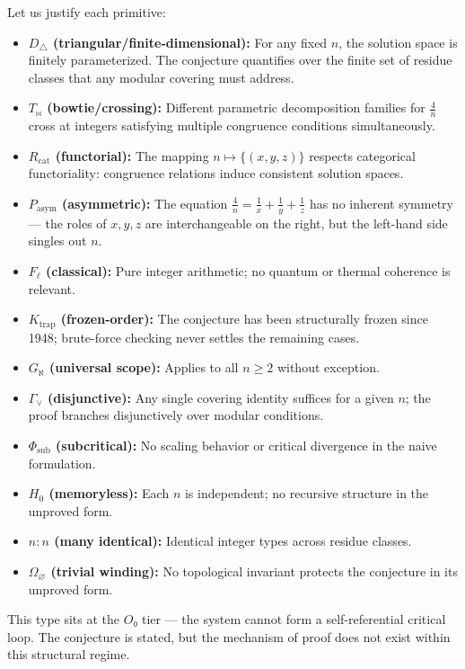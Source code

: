 \documentclass[12pt,a4paper]{article}
\begin{document}
Let us justify each primitive:

\begin{itemize}
    \item \textbf{$D_{\triangle}$ (triangular/finite-dimensional):} For any fixed $n$, the solution space is finitely parameterized. The conjecture quantifies over the finite set of residue classes that any modular covering must address.
    \item \textbf{$T_{\bowtie}$ (bowtie/crossing):} Different parametric decomposition families for $\frac{4}{n}$ cross at integers satisfying multiple congruence conditions simultaneously.
    \item \textbf{$R_\text{cat}$ (functorial):} The mapping $n \mapsto \{(x,y,z)\}$ respects categorical functoriality: congruence relations induce consistent solution spaces.
    \item \textbf{$P_\text{asym}$ (asymmetric):} The equation $\frac{4}{n} = \frac{1}{x} + \frac{1}{y} + \frac{1}{z}$ has no inherent symmetry --- the roles of $x, y, z$ are interchangeable on the right, but the left-hand side singles out $n$.
    \item \textbf{$F_{\ell}$ (classical):} Pure integer arithmetic; no quantum or thermal coherence is relevant.
    \item \textbf{$K_\text{trap}$ (frozen-order):} The conjecture has been structurally frozen since 1948; brute-force checking never settles the remaining cases.
    \item \textbf{$G_{\aleph}$ (universal scope):} Applies to all $n \geq 2$ without exception.
    \item \textbf{$\Gamma_{\vee}$ (disjunctive):} Any single covering identity suffices for a given $n$; the proof branches disjunctively over modular conditions.
    \item \textbf{$\Phi_\text{sub}$ (subcritical):} No scaling behavior or critical divergence in the naive formulation.
    \item \textbf{$H_0$ (memoryless):} Each $n$ is independent; no recursive structure in the unproved form.
    \item \textbf{$n{:}n$ (many identical):} Identical integer types across residue classes.
    \item \textbf{$\Omega_{\varnothing}$ (trivial winding):} No topological invariant protects the conjecture in its unproved form.
\end{itemize}

This type sits at the $O₀$ tier --- the system cannot form a self-referential critical loop. The conjecture is stated, but the mechanism of proof does not exist within this structural regime.
\end{document}
